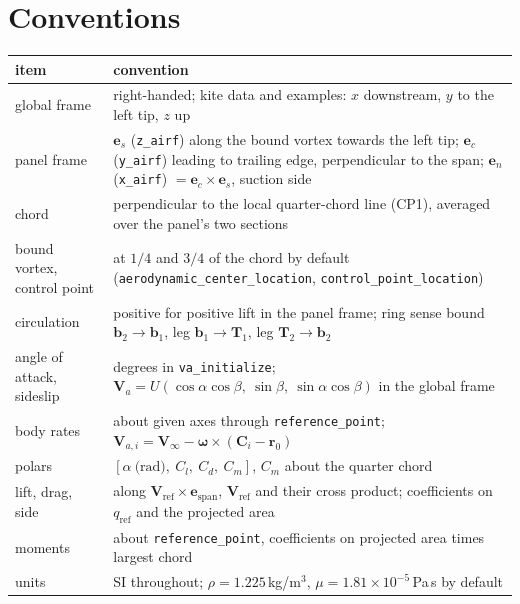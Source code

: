 \documentclass[11pt,a4paper]{article}
\newcommand{\vect}[1]{\mathbf{#1}}
\newcommand{\code}[1]{\texttt{#1}}
\begin{document}
\section{Conventions}
\label{sec:conventions}
\begin{table}[h]\centering\small
\begin{tabular}{>{\raggedright\arraybackslash}p{}>{\raggedright\arraybackslash}p{}}
\toprule
item & convention\\
\midrule
global frame & right-handed; kite data and examples: $x$ downstream, $y$ to the left tip, $z$ up\\
panel frame & $\vect e_s$ (\code{z\_airf}) along the bound vortex towards the left tip; $\vect e_c$ (\code{y\_airf}) leading to trailing edge, perpendicular to the span; $\vect e_n$ (\code{x\_airf}) $=\vect e_c\times\vect e_s$, suction side\\
chord & perpendicular to the local quarter-chord line (CP1), averaged over the panel's two sections\\
bound vortex, control point & at $1/4$ and $3/4$ of the chord by default (\code{aerodynamic\_center\_location}, \code{control\_point\_location})\\
circulation & positive for positive lift in the panel frame; ring sense bound $\vect b_2\to\vect b_1$, leg $\vect b_1\to\vect T_1$, leg $\vect T_2\to\vect b_2$\\
angle of attack, sideslip & degrees in \code{va\_initialize}; $\vect V_a=U(\cos\alpha\cos\beta,\ \sin\beta,\ \sin\alpha\cos\beta)$ in the global frame\\
body rates & about given axes through \code{reference\_point}; $\vect V_{a,i}=\vect V_\infty-\boldsymbol\omega\times(\vect C_i-\vect r_0)$\\
polars & $[\alpha\ \text{(rad)},\ C_l,\ C_d,\ C_m]$, $C_m$ about the quarter chord\\
lift, drag, side & along $\vect V_{\mathrm{ref}}\times\vect e_{\mathrm{span}}$, $\vect V_{\mathrm{ref}}$ and their cross product; coefficients on $q_{\mathrm{ref}}$ and the projected area\\
moments & about \code{reference\_point}, coefficients on projected area times largest chord\\
units & SI throughout; $\rho=1.225$\,kg/m$^3$, $\mu=1.81\times10^{-5}$\,Pa\,s by default\\
\bottomrule
\end{tabular}
\end{table}
\end{document}
